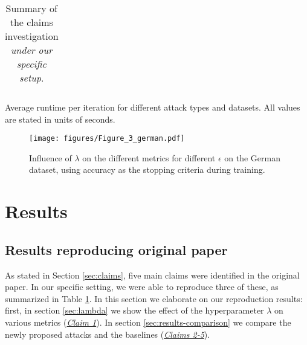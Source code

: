 \begin{table}[t!]
\begin{minipage}{.65\textwidth}
{\begin{tabular}{lccc}
         \end{tabular}}
         \caption{Average runtime per iteration for different attack types and datasets. All values are stated in units of seconds.}
        \label{tab:runtime}
    \end{minipage}
    \hfill
    \begin{minipage}{.3\textwidth}%
        \centering
        \caption{Summary of the claims investigation \textit{under our specific setup}.}
        \label{tab:claims}
    \end{minipage} 
\end{table}



\begin{figure}[t!]
    \centering
    \texttt{[image: figures/Figure\_3\_german.pdf]}
    \caption{Influence of $\lambda$ on the different metrics for different $\epsilon$ on the German dataset, using accuracy as the stopping criteria during training.}
    \label{fig:effect-lambda-german}
\end{figure}

\section{Results}
\label{sec:results}

\subsection{Results reproducing original paper}
As stated in Section \ref{sec:claims}, five main claims were identified in the original paper. In our specific setting, we were able to reproduce three of these, as summarized in Table \ref{tab:claims}. In this section we elaborate on our reproduction results: first, in section \ref{sec:lambda} we show the effect of the hyperparameter $\lambda$ on various metrics (\hyperlink{claim-1}{\textit{Claim 1}}). In section \ref{sec:results-comparison} we compare the newly proposed attacks and the baselines (\hyperlink{claim-2}{\textit{Claims 2-5}}). 

